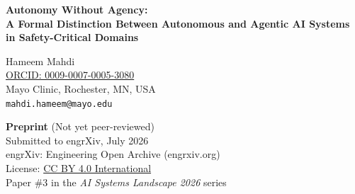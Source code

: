 \documentclass[12pt, a4paper]{article}
\begin{document}
\begin{center}
    {\Large\bfseries Autonomy Without Agency:\\[4pt]
    A Formal Distinction Between Autonomous and Agentic AI Systems\\[2pt]
    in Safety-Critical Domains}

    \vspace{1em}

    {\large Hameem Mahdi}\\[2pt]
    {\small \href{https://orcid.org/0009-0007-0005-3080}{ORCID: 0009-0007-0005-3080}}\\[4pt]
    Mayo Clinic, Rochester, MN, USA\\
    \texttt{mahdi.hameem@mayo.edu}

    \vspace{1em}

    {\small\textbf{Preprint} (Not yet peer-reviewed)}\\[2pt]
    {\small Submitted to engrXiv, July 2026}\\[2pt]
    {\small engrXiv: Engineering Open Archive (engrxiv.org)}\\[2pt]
    {\small License: \href{https://creativecommons.org/licenses/by/4.0/}{CC BY 4.0 International}}\\[2pt]
    {\small Paper \#3 in the \emph{AI Systems Landscape 2026} series}
\end{center}

\vspace{1em}
\end{document}
